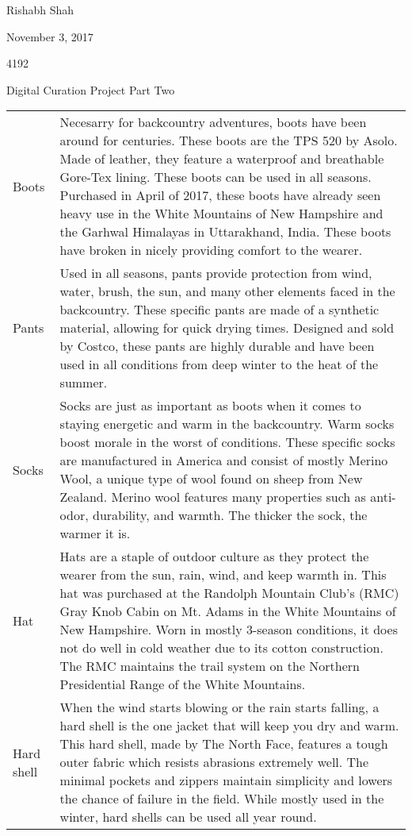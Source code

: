 \documentclass[11pt]{article}
\begin{document}
{\large \noindent Rishabh Shah

\noindent November 3, 2017

 4192

\noindent Digital Curation Project Part Two}

\begin{center}
	\begin{longtable}{>{\raggedleft\arraybackslash}p{1in} >{\raggedright\arraybackslash}p{5.5in}}
		Boots & Necesarry for backcountry adventures, boots have been around for centuries. These boots are the TPS 520 by Asolo. Made of leather, they feature a waterproof and breathable Gore-Tex lining. These boots can be used in all seasons. Purchased in April of 2017, these boots have already seen heavy use in the White Mountains of New Hampshire and the Garhwal Himalayas in Uttarakhand, India. These boots have broken in nicely providing comfort to the wearer.\\
		Pants & Used in all seasons, pants provide protection from wind, water, brush, the sun, and many other elements faced in the backcountry. These specific pants are made of a synthetic material, allowing for quick drying times. Designed and sold by Costco, these pants are highly durable and have been used in all conditions from deep winter to the heat of the summer.\\
		Socks & Socks are just as important as boots when it comes to staying energetic and warm in the backcountry. Warm socks boost morale in the worst of conditions. These specific socks are manufactured in America and consist of mostly Merino Wool, a unique type of wool found on sheep from New Zealand. Merino wool features many properties such as anti-odor, durability, and warmth. The thicker the sock, the warmer it is.\\
		Hat & Hats are a staple of outdoor culture as they protect the wearer from the sun, rain, wind, and keep warmth in. This hat was purchased at the Randolph Mountain Club's (RMC) Gray Knob Cabin on Mt. Adams in the White Mountains of New Hampshire. Worn in mostly 3-season conditions, it does not do well in cold weather due to its cotton construction. The RMC maintains the trail system on the Northern Presidential Range of the White Mountains.\\
		Hard shell & When the wind starts blowing or the rain starts falling, a hard shell is the one jacket that will keep you dry and warm. This hard shell, made by The North Face, features a tough outer fabric which resists abrasions extremely well. The minimal pockets and zippers maintain simplicity and lowers the chance of failure in the field. While mostly used in the winter, hard shells can be used all year round.\\

\end{longtable}
\end{center}
\end{document}
